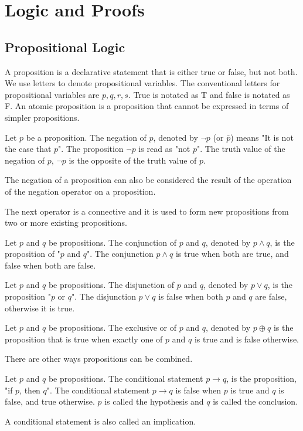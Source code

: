 \documentclass[../discrete.tex]{subfiles}
\begin{document}
\chapter{Logic and Proofs}
\section{Propositional Logic}
A proposition is a declarative statement that is either true or false, but not both. We use letters to denote propositional variables. The conventional letters for propositional variables are $p,q,r,s$. True is notated as T and false is notated as F. An atomic proposition is a proposition that cannot be expressed in terms of simpler propositions.
\begin{definition}
    Let $p$ be a proposition. The negation of $p$, denoted by $\neg{p}$ (or $\bar{p}$) means "It is not the case that $p$".
    \smallbreak
    The proposition $\neg{p}$ is read as "not $p$". The truth value of the negation of $p$, $\neg{p}$ is the opposite of the truth value of $p$.
\end{definition}
The negation of a proposition can also be considered the result of the operation of the negation operator on a proposition. 

The next operator is a connective and it is used to form new propositions from two or more existing propositions.
\begin{definition}
    Let $p$ and $q$ be propositions. The conjunction of $p$ and $q$, denoted by $p\land q$, is the proposition of "$p$ and $q$". The conjunction $p\land q$ is true when both are true, and false when both are false.
\end{definition}
\begin{definition}
    Let $p$ and $q$ be propositions. The disjunction of $p$ and $q$, denoted by $p\lor q$, is the proposition "$p$ or $q$". The disjunction $p\lor q$ is false when both $p$ and $q$ are false, otherwise it is true.
\end{definition}
\begin{definition}
    Let $p$ and $q$ be propositions. The exclusive or of $p$ and $q$, denoted by $p\oplus{q}$ is the proposition that is true when exactly one of $p$ and $q$ is true and is false otherwise.
\end{definition}
There are other ways propositions can be combined.
\begin{definition}
    Let $p$ and $q$ be propositions. The conditional statement $p\rightarrow q$, is the proposition, "if $p$, then $q$". The conditional statement $p\rightarrow q$ is false when $p$ is true and $q$ is false, and true otherwise. $p$ is called the hypothesis and $q$ is called the conclusion.
\end{definition}
A conditional statement is also called an implication.
\end{document}
